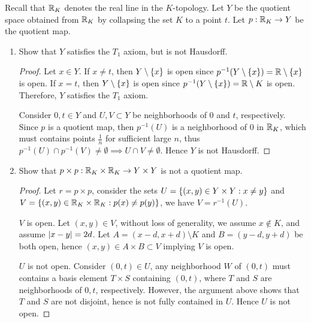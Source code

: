 \documentclass[12pt,a4paper]{article}
\begin{document}
    \begin{ex}
        Recall that $\mathbb{R}_K$ denotes the real line in the $K$-topology. Let $Y$ be the quotient space obtained from $\mathbb{R}_K$ by collapsing the set $K$ to a point $t$. Let $p:\mathbb{R}_K\to Y$ be the quotient map.
        \begin{enumerate}
            \item Show that $Y$ satisfies the $T_1$ axiom, but is not Hausdorff.
            \begin{proof}
                Let $x\in Y$. If $x\neq t$, then $Y\setminus\left\{x\right\}$ is open since $p^{-1}(Y\setminus\left\{x\right\})=\mathbb{R}\setminus\left\{x\right\}$ is open. If $x=t$, then $Y\setminus\left\{x\right\}$ is open since $p^{-1}(Y\setminus\left\{x\right\})=\mathbb{R}\setminus K$ is open. Therefore, $Y$ satisfies the $T_1$ axiom.
                \vspace{1em}

                Consider $0,t\in Y$ and $U,V\subset Y$ be neighborhoods of $0$ and $t$, respectively. Since $p$ is a quotient map, then $p^{-1}(U)$ is a neighborhood of $0$ in $\mathbb{R}_K$, which must contains points $\frac{1}{n}$ for sufficient large $n$, thus $p^{-1}(U)\cap p^{-1}(V)\neq\emptyset\implies U\cap V\neq\emptyset$. Hence $Y$ is not Hausdorff.
            \end{proof}
            \item Show that $p\times p:\mathbb{R}_K\times \mathbb{R}_K\to Y\times Y$ is not a quotient map.
            \begin{proof}
                Let $r=p\times p$, consider the sets $U=\left\{(x,y)\in Y\times Y:x\neq y\right\}$ and $V=\left\{(x,y)\in\mathbb{R}_K\times\mathbb{R}_K:p(x)\neq p(y)\right\}$, we have $V=r^{-1}(U)$. 
                \vspace{1em}
                
                $V$ is open. Let $(x,y)\in V$, without loss of generality, we assume $x\notin K$, and assume $\left\lvert x-y\right\rvert=2d$. Let $A=(x-d,x+d)\setminus K$ and $B=(y-d,y+d)$ be both open, hence $(x,y)\in A\times B\subset V$ implying $V$ is open.
                \vspace{0.5em}
                
                $U$ is not open. Consider $(0,t)\in U$, any neighborhood $W$ of $(0,t)$ must contains a basis element $T\times S$ containing $(0,t)$, where $T$ and $S$ are neighborhoods of $0,t$, respectively. However, the argument above shows that $T$ and $S$ are not disjoint, hence is not fully contained in $U$. Hence $U$ is not open.
            \end{proof}
        \end{enumerate}
    \end{ex}
    \hfill
    
\end{document}
